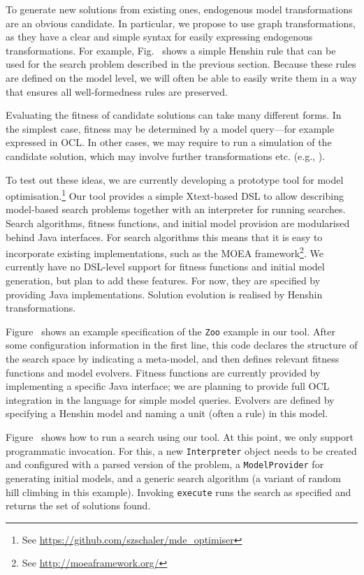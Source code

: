 	To generate new solutions from existing ones, endogenous model transformations are an obvious candidate. In particular, we propose to use graph transformations, as they have a clear and simple
	syntax for easily expressing endogenous transformations. For example, Fig.~ shows a simple Henshin rule that can be used for the search problem described in the previous section.
	Because these rules are defined on the model level, we will often be able to easily write them in a way that ensures all well-formedness rules are preserved.
	
	
	Evaluating the fitness of candidate solutions can take many different forms. In the simplest case, fitness may be determined by a model query---for example expressed in OCL. In other cases, we may
	require to run a simulation of the candidate solution, which may involve further transformations etc. (e.g., \cite{Efstathiou+14,Chatziprimou+14}).
	
	To test out these ideas, we are currently developing a prototype tool for model optimisation.\footnote{See \url{https://github.com/szschaler/mde_optimiser}} Our tool provides a simple Xtext-based
	DSL to allow describing model-based search problems together with an interpreter for running searches. Search algorithms, fitness functions, and initial model provision are modularised behind Java
	interfaces. For search algorithms this means that it is easy to incorporate existing implementations, such as the MOEA framework\footnote{See \url{http://moeaframework.org/}}. We currently have no
	DSL-level support for fitness functions and initial model generation, but plan to add these features. For now, they are specified by providing Java implementations. Solution evolution is realised by
	Henshin transformations.
	
	Figure~ shows an example specification of the \texttt{Zoo} example in our tool. After some configuration information in the first line, this
	code declares the structure of the search space by indicating a meta-model, and then defines relevant fitness functions and model evolvers. Fitness functions are
	currently provided by implementing a specific Java interface; we are planning to provide full OCL integration in the language for simple model queries. Evolvers
	are defined by specifying a Henshin model and naming a unit (often a rule) in this model.
	
	
	Figure~ shows how to run a search using our tool. At this point, we only support programmatic invocation. For this, a new \texttt{Interpreter}
	object needs to be created and configured with a parsed version of the problem, a \texttt{ModelProvider} for generating initial models, and a generic search
	algorithm (a variant of random hill climbing in this example). Invoking \texttt{execute} runs the search as specified and returns the set of solutions found.
	
